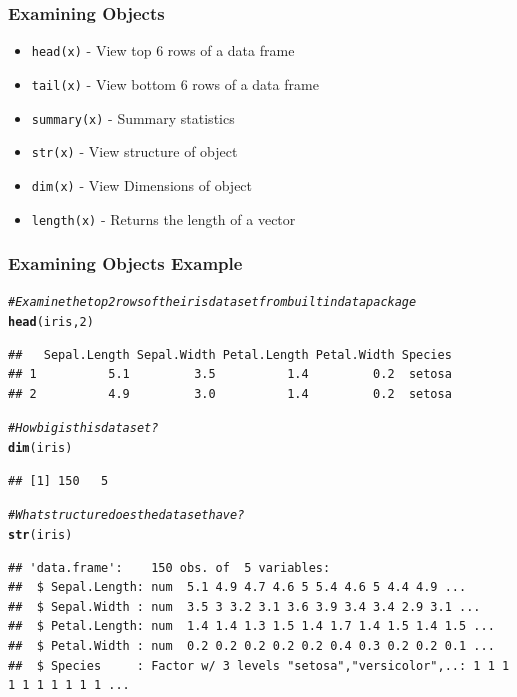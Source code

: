 \documentclass{beamer}\usepackage[]{graphicx}\usepackage[]{color}
\makeatletter
\newcommand{\hlnum}[1]{\textcolor[rgb]{0.686,0.059,0.569}{#1}}%
\newcommand{\hlcom}[1]{\textcolor[rgb]{0.678,0.584,0.686}{\textit{#1}}}%
\newcommand{\hlstd}[1]{\textcolor[rgb]{0.345,0.345,0.345}{#1}}%
\newcommand{\hlkwd}[1]{\textcolor[rgb]{0.737,0.353,0.396}{\textbf{#1}}}%
\newenvironment{kframe}{%
 \def\at@end@of@kframe{}%
 \ifinner\ifhmode%
  \def\at@end@of@kframe{\end{minipage}}%
  \begin{minipage}{\columnwidth}%
 \fi\fi%
 \def\FrameCommand##1{\hskip\@totalleftmargin \hskip-\fboxsep
 \colorbox{shadecolor}{##1}\hskip-\fboxsep
     \hskip-\linewidth \hskip-\@totalleftmargin \hskip\columnwidth}%
 \MakeFramed {\advance\hsize-\width
   \@totalleftmargin\z@ \linewidth\hsize
   \@setminipage}}%
 {\par\unskip\endMakeFramed%
 \at@end@of@kframe}
\newenvironment{knitrout}{}{} %
\makeatother
\begin{document}
\begin{frame}
    \frametitle{Examining Objects}
    \begin{itemize}
        \item \texttt{head(x)} - View top 6 rows of a data frame
        \item \texttt{tail(x)} - View bottom 6 rows of a data frame
        \item \texttt{summary(x)} - Summary statistics   
        \item \texttt{str(x)} - View structure of object  
        \item \texttt{dim(x)} - View Dimensions of object 
        \item \texttt{length(x)} - Returns the length of a vector
    \end{itemize}    
\end{frame}


\begin{frame}[fragile]
    \frametitle{Examining Objects Example}
    \footnotesize
\begin{knitrout}\footnotesize
{}\color{fgcolor}\begin{kframe}
\begin{alltt}
\hlcom{# Examine the top 2 rows of the iris data set from built in data package}
\hlkwd{head}\hlstd{(iris,} \hlnum{2}\hlstd{)}
\end{alltt}
\begin{verbatim}
##   Sepal.Length Sepal.Width Petal.Length Petal.Width Species
## 1          5.1         3.5          1.4         0.2  setosa
## 2          4.9         3.0          1.4         0.2  setosa
\end{verbatim}
\begin{alltt}
\hlcom{# How big is this data set?}
\hlkwd{dim}\hlstd{(iris)}
\end{alltt}
\begin{verbatim}
## [1] 150   5
\end{verbatim}
\begin{alltt}
\hlcom{# What structure does the data set have?}
\hlkwd{str}\hlstd{(iris)}
\end{alltt}
\begin{verbatim}
## 'data.frame':	150 obs. of  5 variables:
##  $ Sepal.Length: num  5.1 4.9 4.7 4.6 5 5.4 4.6 5 4.4 4.9 ...
##  $ Sepal.Width : num  3.5 3 3.2 3.1 3.6 3.9 3.4 3.4 2.9 3.1 ...
##  $ Petal.Length: num  1.4 1.4 1.3 1.5 1.4 1.7 1.4 1.5 1.4 1.5 ...
##  $ Petal.Width : num  0.2 0.2 0.2 0.2 0.2 0.4 0.3 0.2 0.2 0.1 ...
##  $ Species     : Factor w/ 3 levels "setosa","versicolor",..: 1 1 1 1 1 1 1 1 1 1 ...
\end{verbatim}
\end{kframe}
\end{knitrout}

    \normalsize
\end{frame}
\end{document}
